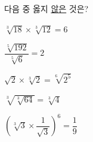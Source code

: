 다음 중 옳지 \underline{않은} 것은?
\begin{choicesii}{\rule[-3ex]{0pt}{8ex}$\sqrt[3]{18}\times\sqrt[3]{12}=6$}{\rule[-3ex]{0pt}{8ex}$\dfrac{\sqrt[5]{192}}{\sqrt[5]{6}}=2$}{\rule[-3ex]{0pt}{8ex}$\sqrt{2}\times\sqrt[3]{2}=\sqrt[6]{2^5}$}{\rule[-3ex]{0pt}{8ex}$\sqrt[3]{\sqrt[3]{64}}=\sqrt[3]{4}$}{\rule[-3ex]{0pt}{8ex}$\left(\sqrt[3]{3}\times\dfrac{1}{\sqrt{3}}\right)^{6}=\dfrac{1}{9}$}\end{choicesii}
